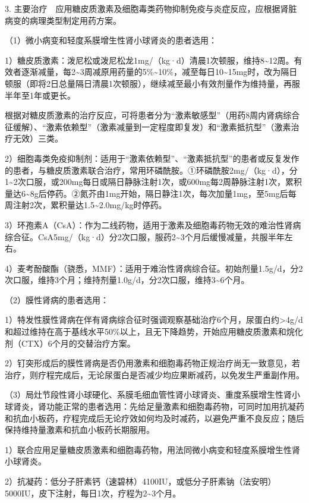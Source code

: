 3.
主要治疗　应用糖皮质激素及细胞毒类药物抑制免疫与炎症反应，应根据肾脏病变的病理类型制定用药方案。

（1）微小病变和轻度系膜增生性肾小球肾炎的患者选用：

1）糖皮质激素：泼尼松或泼尼松龙1mg/（kg·d）清晨1次顿服，维持8\textasciitilde{}12周。有效者逐渐减量，每2\textasciitilde{}3周减原用药量的5\%\textasciitilde{}10\%，减至每日10\textasciitilde{}15mg时，改为隔日顿服（即将2日总量隔日清晨1次顿服），继续减至最小有效剂量作为维持量，再服半年至1年或更长。

根据对糖皮质激素的治疗反应，可将患者分为“激素敏感型”（用药8周内肾病综合征缓解）、“激素依赖型”（激素减量到一定程度即复发）和“激素抵抗型”（激素治疗无效）三类。

2）细胞毒类免疫抑制剂：适用于“激素依赖型”、“激素抵抗型”的患者或反复发作的患者，与糖皮质激素联合治疗，常用环磷酰胺。①环磷酰胺2mg/（kg·d），分1\textasciitilde{}2次口服，或200mg每日或隔日静脉注射1次，或600mg每2周静脉注射1次，累积量达6\textasciitilde{}8g后停药。②氮芥由1mg开始，隔日静注1次，每次加量1mg，至5mg后每周注射2次，累积量达1.5\textasciitilde{}2.0mg/kg时停药。

3）环孢素A（CsA）：作为二线药物，适用于激素及细胞毒药物无效的难治性肾病综合征。CsA5mg/（kg·d）分2次口服，服药2\textasciitilde{}3个月后缓慢减量，共服半年左右。

4）麦考酚酸酯（骁悉，MMF）：适用于难治性肾病综合征。初始剂量1.5g/d，分2次口服，维持3个月；维持剂量1.0g/d，分2次口服，维持3\textasciitilde{}6个月。

（2）膜性肾病的患者选用：

1）特发性膜性肾病在伴有肾病综合征时强调观察基础治疗6个月，尿蛋白约\textgreater{}4g/d和超过维持在高于基线水平50\%以上，且无下降趋势，开始应用糖皮质激素和烷化剂（CTX）6个月的交替治疗方案。

2）钉突形成后的膜性肾病是否仍用激素和细胞毒药物正规治疗尚无一致意见，若治疗，则疗程完成后，无论尿蛋白是否减少均应果断减药，以免发生严重副作用。

（3）局灶节段性肾小球硬化、系膜毛细血管性肾小球肾炎、重度系膜增生性肾小球肾炎，肾功能正常的患者选用：先给足量激素和细胞毒药物，可同时加用抗凝药和抗血小板药，疗程完成后无论疗效如何均及时减药，以避免严重不良反应；随后保持维持量激素和抗血小板药长期服用。

1）联合应用足量糖皮质激素和细胞毒药物，用法同微小病变和轻度系膜增生性肾小球肾炎。

2）抗凝药：低分子肝素钙（速碧林）4100IU，或低分子肝素钠（法安明）5000IU，皮下注射，每日1次，疗程为2\textasciitilde{}3个月。

